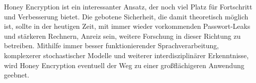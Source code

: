 Honey Encryption ist ein interessanter Ansatz, der noch viel Platz für Fortschritt und Verbesserung bietet. Die gebotene Sicherheit, die damit theoretisch möglich ist, sollte in der heutigen Zeit, mit immer wieder vorkommenden Passwort-Leaks und stärkeren Rechnern, Anreiz sein, weitere Forschung in dieser Richtung zu betreiben. Mithilfe immer besser funktionierender Sprachverarbeitung, komplexerer stochastischer Modelle und weiterer interdisziplinärer Erkenntnisse, wird Honey Encryption eventuell der Weg zu einer großflächigeren Anwendung geebnet.